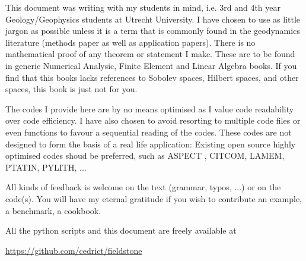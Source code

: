 
This document was writing with my students in mind, i.e. 3rd and 4th year 
Geology/Geophysics students at Utrecht University. 
I have chosen to use as little jargon as possible unless it is a term that is 
commonly found in the geodynamics literature (methods paper as well as 
application papers). There is no mathematical proof of any theorem or statement 
I make. These are to be found in generic Numerical Analysic, Finite Element and 
Linear Algebra books. If you find that this books lacks references
to Sobolev spaces, Hilbert spaces, and other spaces, this book is just not for you.  

The codes I provide here are by no means optimised as I value code readability 
over code efficiency. I have also chosen to avoid resorting to multiple code 
files or even functions to favour a sequential reading of the codes. 
These codes are not designed to form the basis of a real life application:
Existing open source highly optimised codes shoud be preferred, such as 
ASPECT \cite{krhb12,hedg17}, CITCOM, LAMEM, PTATIN, PYLITH, ... 

All kinds of feedback is welcome on the text (grammar, typos, ...) or on the 
code(s). You will have my eternal gratitude if you wish to contribute an 
example, a benchmark, a cookbook. 

All the python scripts and this document are freely available at 
\begin{center}
\url{https://github.com/cedrict/fieldstone}
\end{center}

